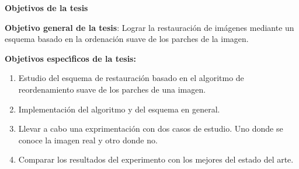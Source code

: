 \begin{abstract}
	[Redactar el abstract]  
\end{abstract}
\newpage

\begin{center}
	{\large \textbf{Objetivos de la tesis}}
\end{center}
\qquad 

\qquad \textbf{Objetivo general de la tesis}: Lograr la restauraci\'on de im\'agenes mediante un esquema basado en la ordenaci\'on suave de los parches de la imagen.

\qquad 

\qquad 

\qquad \textbf{Objetivos espec\'{\i}ficos de la tesis:}

\begin{enumerate}
\item Estudio del esquema de restauraci\'on basado en el algoritmo de reordenamiento suave de los parches de una imagen.
\item Implementaci\'on del algoritmo y del esquema en general.
\item Llevar a cabo una exprimentaci\'on con dos casos de estudio. Uno donde se conoce la imagen real y otro donde no.
\item Comparar los resultados del experimento con los mejores del estado del arte.
\end{enumerate}
